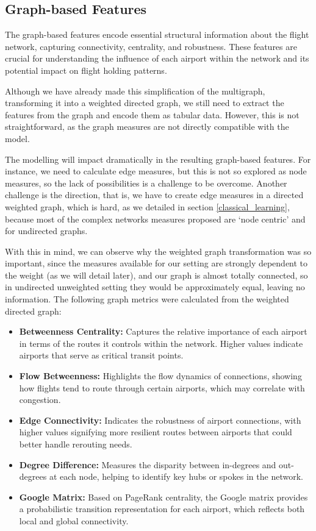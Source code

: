 




\subsection{Graph-based Features} The graph-based features encode
essential structural information about the flight network, capturing
connectivity, centrality, and robustness. These features are crucial
for understanding the influence of each airport within the network and
its potential impact on flight holding patterns.

Although we have already made this simplification of the multigraph,
transforming it into a weighted directed graph, we still need to
extract the features from the graph and encode them as tabular
data. However, this is not straightforward, as the graph measures are
not directly compatible with the model.

The modelling will impact dramatically in the resulting graph-based
features. For instance, we need to calculate edge measures, but this
is not so explored as node measures, so the lack of possibilities is a
challenge to be overcome.  Another challenge is the direction, that
is, we have to create edge measures in a directed weighted graph,
which is hard, as we detailed in section \ref{classical_learning},
because most of the complex networks measures proposed are `node
centric' and for undirected graphs.

With this in mind, we can observe why the weighted graph
transformation was so important, since the measures available for our
setting are strongly dependent to the weight (as we will detail
later), and our graph is almost totally connected, so in undirected
unweighted setting they would be approximately equal, leaving no
information. The following graph metrics were calculated from the
weighted directed graph:

\begin{itemize}
\item \textbf{Betweenness Centrality:} Captures the relative
importance of each airport in terms of the routes it controls within
the network. Higher values indicate airports that serve as critical
transit points.
\item \textbf{Flow Betweenness:} Highlights the flow dynamics of
connections, showing how flights tend to route through certain
airports, which may correlate with congestion.
\item \textbf{Edge Connectivity:} Indicates the robustness of airport
connections, with higher values signifying more resilient routes
between airports that could better handle rerouting needs.
\item \textbf{Degree Difference:} Measures the disparity between
in-degrees and out-degrees at each node, helping to identify key hubs
or spokes in the network.
\item \textbf{Google Matrix:} Based on PageRank centrality, the Google
matrix provides a probabilistic transition representation for each
airport, which reflects both local and global connectivity.
\end{itemize}

